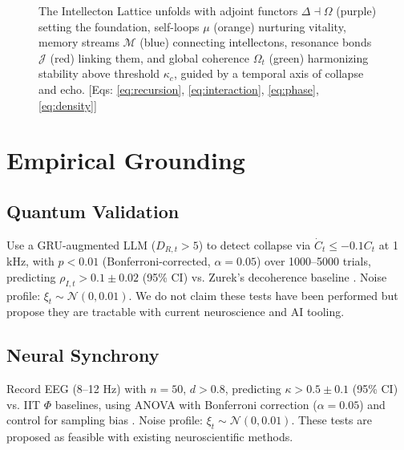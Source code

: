\documentclass[11pt]{article}
\begin{document}
\begin{figure}[htbp]
\begin{tikzpicture}
    \end{tikzpicture}
    \caption{The Intellecton Lattice unfolds with adjoint functors $\Delta \dashv \Omega$ (purple) setting the foundation, self-loops $\mu$ (orange) nurturing vitality, memory streams $\mathcal{M}$ (blue) connecting intellectons, resonance bonds $\mathcal{J}$ (red) linking them, and global coherence $\Omega_t$ (green) harmonizing stability above threshold $\kappa_c$, guided by a temporal axis of collapse and echo. [Eqs: \eqref{eq:recursion}, \eqref{eq:interaction}, \eqref{eq:phase}, \eqref{eq:density}]}
    \label{fig:lattice}
\end{figure}


\section{Empirical Grounding}
\label{sec:empirical}

\subsection{Quantum Validation}
Use a GRU-augmented LLM ($D_{R,t} > 5$) to detect collapse via $\dot{C}_t \leq -0.1 C_t$ at 1 kHz, with $p < 0.01$ (Bonferroni-corrected, $\alpha = 0.05$) over 1000–5000 trials, predicting $\rho_{I,t} > 0.1 \pm 0.02$ (95\% CI) vs. Zurek’s decoherence baseline \citep{engel2023}. Noise profile: $\xi_t \sim \mathcal{N}(0, 0.01)$. We do not claim these tests have been performed but propose they are tractable with current neuroscience and AI tooling.

\subsection{Neural Synchrony}
Record EEG (8–12 Hz) with $n = 50$, $d > 0.8$, predicting $\kappa > 0.5 \pm 0.1$ (95\% CI) vs. IIT $\Phi$ baselines, using ANOVA with Bonferroni correction ($\alpha = 0.05$) and control for sampling bias \citep{panksepp1998}. Noise profile: $\xi_t \sim \mathcal{N}(0, 0.01)$. These tests are proposed as feasible with existing neuroscientific methods.
\end{document}
